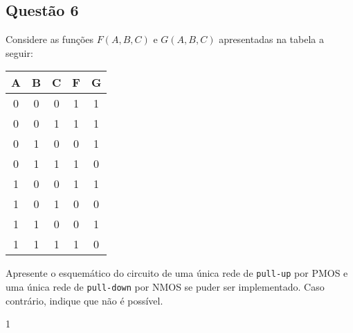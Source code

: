\documentclass{article}
\begin{document}
        \subsection{Questão 6}
            \begin{exercise}
                Considere as funções $F(A,B,C)$ e $G(A,B,C)$ apresentadas na tabela a seguir:
                    \begin{table}[H]
                        \centering  
                        \begin{tabular}[]{ccc|cc}\hline
                            A & B & C & F & G\\\hline
                            0 & 0 & 0 & 1 & 1\\
                            0 & 0 & 1 & 1 & 1\\
                            0 & 1 & 0 & 0 & 1\\
                            0 & 1 & 1 & 1 & 0\\
                            1 & 0 & 0 & 1 & 1\\
                            1 & 0 & 1 & 0 & 0\\
                            1 & 1 & 0 & 0 & 1\\
                            1 & 1 & 1 & 1 & 0\\\hline
                        \end{tabular}
                    \end{table}
                Apresente o esquemático do circuito de uma única rede de \texttt{pull-up} por PMOS e uma única rede de \texttt{pull-down} por NMOS se puder ser implementado. Caso contrário, indique que não é possível.
            \end{exercise}
            \begin{resolution}
                1
            \end{resolution}

\newpage
\end{document}
